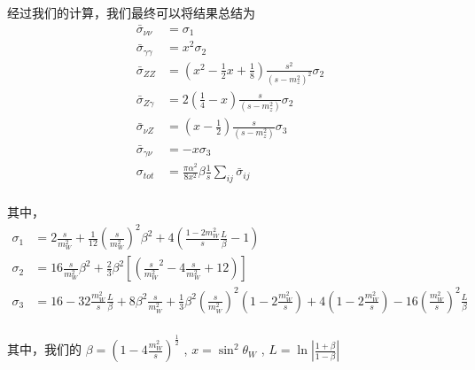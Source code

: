 \documentclass{article}
\begin{document}
经过我们的计算，我们最终可以将结果总结为\cite{commins1985weak}
\begin{align*}
    \bar{\sigma}_{\nu\nu} &= \sigma_1 \\
    \bar{\sigma}_{\gamma\gamma} &= x^2 \sigma_2\\
    \bar{\sigma}_{ZZ} &= \left(x^2 - \frac{1}{2}x + \frac{1}{8}\right)\frac{s^2}{\left(s - m_z^2\right)^2}\sigma_2\\
    \bar{\sigma}_{Z\gamma} &= 2\left(\frac{1}{4} - x\right)\frac{s}{\left(s - m_z^2\right)}\sigma_2\\
    \bar{\sigma}_{\nu Z} &= \left(x - \frac{1}{2}\right)\frac{s}{\left(s - m_z^2\right)}\sigma_3\\
    \bar{\sigma}_{\gamma \nu} &= -x\sigma_3\\
    \sigma_{tot} &= \frac{\pi \alpha^2}{8 x^2} \beta \frac{1}{s} \sum_{ij}\bar{\sigma}_{ij} \\
\end{align*}

其中，
\begin{align*}
    \sigma_1 &= 2 \frac{s}{m_W^2} + \frac{1}{12} \left(\frac{s}{m_W^2}\right)^2 \beta^2 + 4\left(\frac{1 - 2 m_W^2}{s}\frac{L}{\beta} - 1\right) \\
    \sigma_2 &= 16 \frac{s}{m_W^2}\beta^2 + \frac{2}{3} \beta^2 \left[\left(\frac{s}{m_W^2}^2 - 4\frac{s}{m_W^2} + 12\right)\right] \\
    \sigma_3 &= 16 - 32 \frac{m_W^2}{s} \frac{L}{\beta} + 8\beta^2 \frac{s}{m_W^2} + \frac{1}{3} \beta^2\left(\frac{s}{m_W^2}\right)^2 \left(1 - 2\frac{m_W^2}{s}\right) + 4\left(1 - 2\frac{m_W^2}{s}\right) - 16\left(\frac{m_W^2}{s}\right)^2\frac{L}{\beta} \\
\end{align*}

其中，我们的 $\displaystyle \beta = \left(1 - 4 \frac{m_W^2}{s}\right)^{\frac{1}{2}}$ , $\displaystyle x = \sin^2\theta_W$ , $\displaystyle L = \ln\left|\frac{1 + \beta}{1 - \beta}\right|$






\newpage

\begin{center}
    \nocite{Veltman_1994}
    \nocite{Peskin:1995ev}
    \nocite{Paschos_2023a}
    \nocite{griffiths2008introduction}
\end{center}
\end{document}
